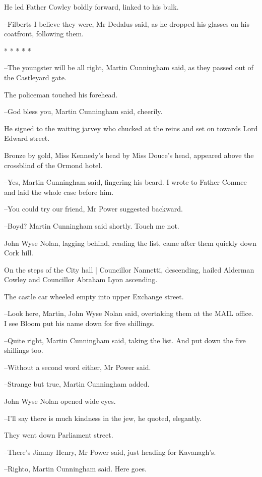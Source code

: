 He led Father Cowley boldly forward,
linked to his bulk.

--Filberts I believe they were,
Mr Dedalus said,
as he dropped his
glasses on his coatfront,
following them.


    * * * * *


--The youngster will be all right,
Martin Cunningham said,
as they passed
out of the Castleyard gate.

The policeman touched his forehead.

--God bless you,
Martin Cunningham said, cheerily.

He signed to the waiting jarvey
who chucked at the reins and set on towards Lord Edward street.

Bronze by gold,
Miss Kennedy's head by Miss Douce's head,
appeared above
the crossblind of the Ormond hotel.

--Yes,
Martin Cunningham said,
fingering his beard.
I wrote to Father
Conmee and laid the whole case before him.

--You could try our friend,
Mr Power suggested backward.

--Boyd?
Martin Cunningham said shortly.
Touch me not.

John Wyse Nolan, lagging behind, reading the list,
came after them
quickly down Cork hill.

On the steps of the City hall |
Councillor Nannetti, descending,
hailed
Alderman Cowley and Councillor Abraham Lyon ascending.

The castle car wheeled empty into upper Exchange street.

--Look here, Martin,
John Wyse Nolan said,
overtaking them at the MAIL
office.
I see Bloom put his name down for five shillings.

--Quite right,
Martin Cunningham said,
taking the list.
And put down the
five shillings too.

--Without a second word either,
Mr Power said.

--Strange but true,
Martin Cunningham added.

John Wyse Nolan opened wide eyes.

--I'll say there is much kindness in the jew,
he quoted, elegantly.

They went down Parliament street.

--There's Jimmy Henry,
Mr Power said,
just heading for Kavanagh's.

--Righto,
Martin Cunningham said.
Here goes.

